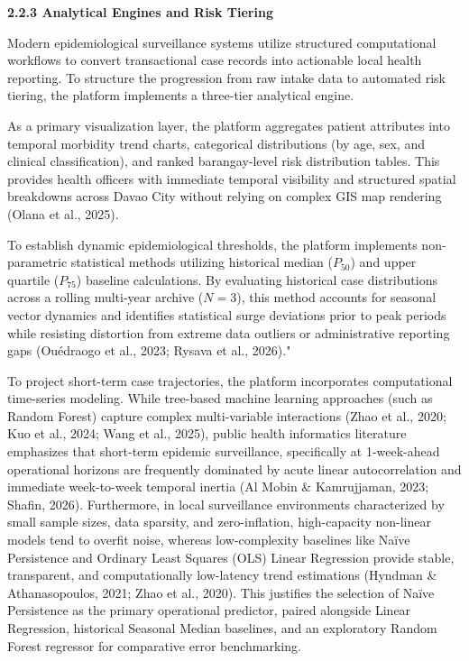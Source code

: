 \documentclass[
]{article}
\begin{document}
\textbf{2.2.3 Analytical Engines and Risk Tiering}

Modern epidemiological surveillance systems utilize structured
computational workflows to convert transactional case records into
actionable local health reporting. To structure the progression from raw
intake data to automated risk tiering, the platform implements a
three-tier analytical engine.

As a primary visualization layer, the platform aggregates patient
attributes into temporal morbidity trend charts, categorical
distributions (by age, sex, and clinical classification), and ranked
barangay-level risk distribution tables. This provides health officers
with immediate temporal visibility and structured spatial breakdowns
across Davao City without relying on complex GIS map rendering (Olana et
al., 2025).

To establish dynamic epidemiological thresholds, the platform implements
non-parametric statistical methods utilizing historical median
(\(P_{50}\)) and upper quartile (\(P_{75}\)) baseline calculations. By
evaluating historical case distributions across a rolling multi-year
archive (\(N = 3\)), this method accounts for seasonal vector dynamics
and identifies statistical surge deviations prior to peak periods while
resisting distortion from extreme data outliers or administrative
reporting gaps (Ouédraogo et al., 2023; Rysava et al., 2026)."

To project short-term case trajectories, the platform incorporates
computational time-series modeling. While tree-based machine learning
approaches (such as Random Forest) capture complex multi-variable
interactions (Zhao et al., 2020; Kuo et al., 2024; Wang et al., 2025),
public health informatics literature emphasizes that short-term epidemic
surveillance, specifically at 1-week-ahead operational horizons are
frequently dominated by acute linear autocorrelation and immediate
week-to-week temporal inertia (Al Mobin \& Kamrujjaman, 2023; Shafin,
2026). Furthermore, in local surveillance environments characterized by
small sample sizes, data sparsity, and zero-inflation, high-capacity
non-linear models tend to overfit noise, whereas low-complexity
baselines like Naïve Persistence and Ordinary Least Squares (OLS) Linear
Regression provide stable, transparent, and computationally low-latency
trend estimations (Hyndman \& Athanasopoulos, 2021; Zhao et al., 2020). This justifies the
selection of Naïve Persistence as the primary operational predictor,
paired alongside Linear Regression, historical Seasonal Median
baselines, and an exploratory Random Forest regressor for comparative
error benchmarking.
\end{document}
